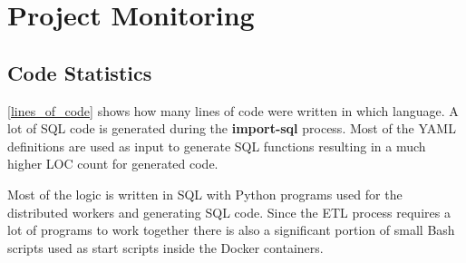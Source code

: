 \chapter{Project Monitoring}\label{project monitoring}

\section{Code Statistics}
\noindent\begin{minipage}[t]{0.48\linewidth}
    \vspace{0pt}
    \autoref{lines_of_code} shows how many lines of code were written in which language. A lot of SQL code is generated during the \textbf{import-sql} process. Most of the YAML definitions are used as input to generate SQL functions resulting in a much higher LOC count for generated code.
    
    Most of the logic is written in SQL with Python programs used for the distributed workers and generating SQL code. Since the ETL process requires a lot of programs to work together there is also a significant portion of small Bash scripts used as start scripts inside the Docker containers.
\end{minipage}
\hfill
